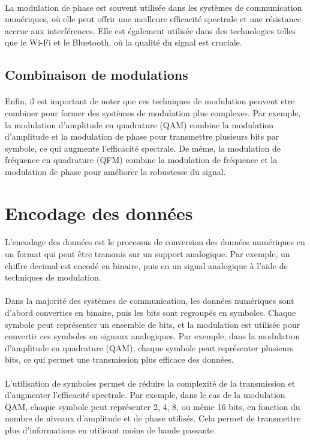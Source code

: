 \documentclass[a4paper,twocolumn]{report}
\begin{document}
\paragraph{}La modulation de phase est souvent utilisée dans les systèmes de communication numériques, où elle peut offrir une meilleure efficacité spectrale et une résistance accrue aux interférences. Elle est également utilisée dans des technologies telles que le Wi-Fi et le Bluetooth, où la qualité du signal est cruciale.

\subsection{Combinaison de modulations}
\paragraph{}Enfin, il est important de noter que ces techniques de modulation peuvent etre combiner pour former des systèmes de modulation plus complexes. Par exemple, la modulation d'amplitude en quadrature (QAM) combine la modulation d'amplitude et la modulation de phase pour transmettre plusieurs bits par symbole, ce qui augmente l'efficacité spectrale. De même, la modulation de fréquence en quadrature (QFM) combine la modulation de fréquence et la modulation de phase pour améliorer la robustesse du signal.

\section{Encodage des données}

\paragraph{}L'encodage des données est le processus de conversion des données numériques en un format qui peut être transmis sur un support analogique. Par exemple, un chiffre decimal est encodé en binaire, puis en un signal analogique à l'aide de techniques de modulation.
\paragraph{}Dans la majorité des systèmes de communication, les données numériques sont d'abord converties en binaire, puis les bits sont regroupés en symboles. Chaque symbole peut représenter un ensemble de bits, et la modulation est utilisée pour convertir ces symboles en signaux analogiques. Par exemple, dans la modulation d'amplitude en quadrature (QAM), chaque symbole peut représenter plusieurs bits, ce qui permet une transmission plus efficace des données.
\paragraph{}L'utilisation de symboles permet de réduire la complexité de la transmission et d'augmenter l'efficacité spectrale. Par exemple, dans le cas de la modulation QAM, chaque symbole peut représenter 2, 4, 8, ou même 16 bits, en fonction du nombre de niveaux d'amplitude et de phase utilisés. Cela permet de transmettre plus d'informations en utilisant moins de bande passante.
\end{document}
